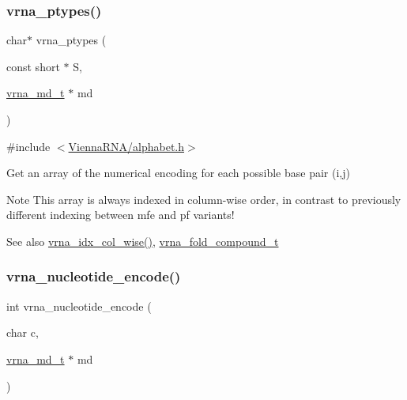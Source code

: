 \subsubsection{\texorpdfstring{vrna\+\_\+ptypes()}{vrna\_ptypes()}}
{\footnotesize\ttfamily char$\ast$ vrna\+\_\+ptypes (\begin{DoxyParamCaption}\item[{const short $\ast$}]{S,  }\item[{\hyperlink{group__model__details_ga1f8a10e12a0a1915f2a4eff0b28ea17c}{vrna\+\_\+md\+\_\+t} $\ast$}]{md }\end{DoxyParamCaption})}



{\ttfamily \#include $<$\hyperlink{alphabet_8h}{Vienna\+R\+N\+A/alphabet.\+h}$>$}



Get an array of the numerical encoding for each possible base pair (i,j) 

\begin{DoxyNote}{Note}
This array is always indexed in column-\/wise order, in contrast to previously different indexing between mfe and pf variants!
\end{DoxyNote}
\begin{DoxySeeAlso}{See also}
\hyperlink{group__utils_ga89ebc69c52fa0c78c9e1974b0017746b}{vrna\+\_\+idx\+\_\+col\+\_\+wise()}, \hyperlink{group__fold__compound_ga1b0cef17fd40466cef5968eaeeff6166}{vrna\+\_\+fold\+\_\+compound\+\_\+t} 
\end{DoxySeeAlso}
\mbox{\label{group__alphabet__utils_gac12bf00123f88621c9be847b0879c1fb}} 
\subsubsection{\texorpdfstring{vrna\+\_\+nucleotide\+\_\+encode()}{vrna\_nucleotide\_encode()}}
{\footnotesize\ttfamily int vrna\+\_\+nucleotide\+\_\+encode (\begin{DoxyParamCaption}\item[{char}]{c,  }\item[{\hyperlink{group__model__details_ga1f8a10e12a0a1915f2a4eff0b28ea17c}{vrna\+\_\+md\+\_\+t} $\ast$}]{md }\end{DoxyParamCaption})}



